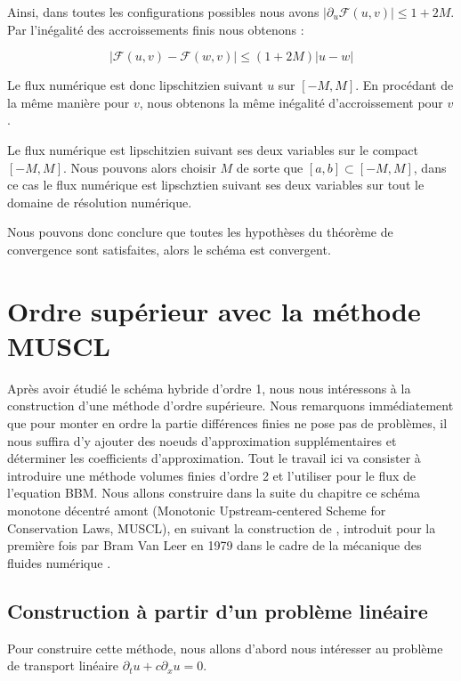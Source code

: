 \vspace{1em}

Ainsi, dans toutes les configurations possibles nous avons $|\partial_u\mathcal{F}(u,v)| \leq 1 + 2M$. Par l'inégalité des accroissements finis nous obtenons :

$$\big| \mathcal{F}(u,v) - \mathcal{F}(w,v)\big| \leq (1 + 2M)|u - w|$$

Le flux numérique est donc lipschitzien suivant $u$ sur $[-M,M]$.
En procédant de la même manière pour $v$, nous obtenons la même inégalité d'accroissement pour $v$.

Le flux numérique est lipschitzien suivant ses deux variables sur le compact $[-M,M]$. Nous pouvons alors choisir $M$ de sorte que $[a,b] \subset [-M,M]$, dans ce cas le flux numérique est lipschztien suivant ses deux variables sur tout le domaine de résolution numérique.

\vspace{1em}

Nous pouvons donc conclure que toutes les hypothèses du théorème de convergence sont satisfaites, alors le schéma est convergent.

\section{Ordre supérieur avec la méthode MUSCL}

Après avoir étudié le schéma hybride d'ordre 1, nous nous intéressons à la construction d'une méthode d'ordre supérieure. 
Nous remarquons immédiatement que pour monter en ordre la partie différences finies ne pose pas de problèmes, il nous suffira d'y ajouter des noeuds d'approximation supplémentaires et déterminer les coefficients d'approximation. 
Tout le travail ici va consister à introduire une méthode volumes finies d'ordre 2 et l'utiliser pour le flux de l'equation BBM. 
Nous allons construire dans la suite du chapitre ce schéma monotone décentré amont (Monotonic Upstream-centered Scheme for Conservation Laws, MUSCL), en suivant la construction de \cite{Fabien_VF}, introduit pour la première fois par Bram Van Leer en 1979 dans le cadre de la mécanique des fluides numérique \cite{van-leer}. 

\subsection{Construction à partir d'un problème linéaire}

Pour construire cette méthode, nous allons d'abord nous intéresser au problème de transport linéaire $\partial_t u + c\partial_xu =0$.


